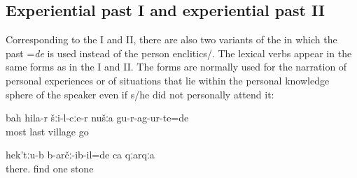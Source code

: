 
\subsection{Experiential past I and experiential past II}
\label{ssec:Experiential past I and experiential past II}

Corresponding to the  I and II, there are also two variants of the  in which the past  =\textit{de} is used instead of the person enclitics\slash {}. The lexical verbs appear in the same forms as in the  I and II. The  forms are normally used for the narration of personal experiences or of situations that lie within the personal knowledge sphere of the speaker even if s/he did not personally attend it:
%
\begin{exe}
	\ex	\label{ex:As the very last we moved away from the village analytic}
	\gll	bah	hila-r šːi-l-cːe-r	nušːa	gu-r-ag-ur-te=de\\
		most	last	village		go\\
	\glt	{}

	\ex	\label{ex:‎Up there we found a stone analytic}
	\gll	hek'tːu-b	b-arčː-ib-il=de	ca	qːarqːa\\
		there.	find	one	stone\\
	\glt	{}
\end{exe}

